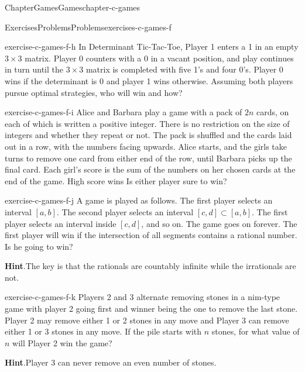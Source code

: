 \documentclass[oneside,10pt,]{book}
\newcommand{\blocktitlefont}{\relax}
\numberwithin{equation}{section}
\begin{document}
\begin{chapterptx}{Chapter}{Games}{}{Games}{}{}{chapter-c-games}
\begin{exercises-section}{Exercises}{Problems}{}{Problems}{}{}{exercises-c-games-f}
\begin{divisionexercise}{7}{}{}{exercise-c-games-f-h}
In  Determinant Tic-Tac-Toe, Player 1 enters a 1 in an empty \(3\times 3\) matrix. Player 0 counters with a 0 in a vacant position, and play continues in turn until the \(3 \times  3\) matrix is completed with five 1's and four 0's. Player 0 wins if the determinant is 0 and player 1 wins otherwise. Assuming both players pursue optimal strategies, who will win and how?%
\end{divisionexercise}%
\begin{divisionexercise}{8}{}{}{exercise-c-games-f-i}%
Alice and Barbara play a game with a pack of \(2n\) cards, on each of which is written a positive integer. There is no restriction on the size of integers and whether they repeat or not.   The pack is shuffled and the cards laid out in a row, with the numbers facing upwards. Alice starts, and the girls take turns to remove one card from either end of the row, until Barbara picks up the final card. Each girl's score is the sum of the numbers on her chosen cards at the end of the game. High score wins  Is either player sure to win?%
\end{divisionexercise}%
\begin{divisionexercise}{9}{}{}{exercise-c-games-f-j}%
A game is played as follows. The first player selects an interval \([a, b]\). The second player selects an interval \([c, d] \subset  [a, b]\). The first player selects an interval inside \([c, d]\), and so on. The game goes on forever. The first player will win if the intersection of all segments contains a rational number. Is he going to win?%
\par\smallskip%
\noindent\textbf{\blocktitlefont Hint}.\hypertarget{hint-c-games-f-j-b}{}\quad{}The key is that the rationals are countably infinite while the irrationals are not.%
\end{divisionexercise}%
\begin{divisionexercise}{10}{}{}{exercise-c-games-f-k}%
Players 2 and 3 alternate removing stones in a nim-type game with player 2 going first and winner being the one to remove the last stone. Player 2 may remove either 1 or 2 stones in any move and Player 3 can remove either 1 or 3 stones in any move.  If the pile starts with \(n\) stones, for what value of \(n\) will Player 2 win the game?%
\par\smallskip%
\noindent\textbf{\blocktitlefont Hint}.\hypertarget{hint-c-games-f-k-b}{}\quad{}Player 3 can never remove an even number of stones.%
\end{divisionexercise}%
\end{exercises-section}
\end{chapterptx}
\end{document}
